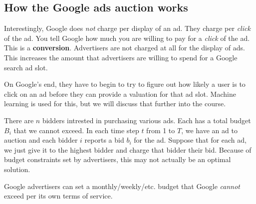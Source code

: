 \documentclass[titlepage, 12pt, leqno]{article}
\begin{document}
\subsection{How the Google ads auction works}
Interestingly, Google does \textit{not} charge per display of an ad. They charge
per \textit{click} of the ad. You tell Google how much you are willing to pay for
a \textit{click} of the ad. This is a \textbf{conversion}. Advertisers are not
charged at all for the display of ads. This increases the amount that 
advertisers are willing to spend for a Google search ad slot.

On Google's end, they have to begin to try to figure out how likely a user is to
click on an ad before they can provide a valuation for that ad slot. Machine
learning is used for this, but we will discuss that further into the course.

There are $n$ bidders intrested in purchasing various ads. Each has a total 
budget $B_{i}$ that we cannot exceed. In each time step $t$ from 1 to $T$, we 
have an ad to auction and each bidder $i$ reports a bid $b_{i}$ for the ad. 
Suppose that for each ad, we just give it to the highest bidder and charge that
bidder their bid. Because of budget constraints set by advertisers, this may not
actually be an optimal solution.

\begin{note}
    Google advertisers can set a monthly/weekly/etc. budget that Google 
    \textit{cannot} exceed per its own terms of service.
\end{note}
\end{document}
